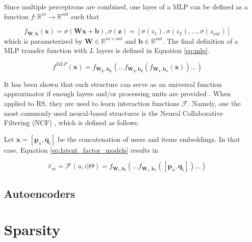     Since multiple perceptrons are combined, one layer of a MLP can be defined as a function  $f: \mathbb{R}^{in} \rightarrow \mathbb{R}^{out}$ such that 
    
    \begin{equation*}
        f_{\mathbf{W}, \mathbf{b}}(\mathbf{x}) = \sigma(\mathbf{W}\mathbf{x} + \mathbf{b}), \sigma(\mathbf{z}) = [\sigma(z_1), \sigma(z_2), \ldots, \sigma(z_{out})]
        \label{eq:layer}
    \end{equation*} which is parameterized by $\textbf{W} \in \mathbb{R}^{in \times out}$ and $\mathbf{b} \in \mathbb{R}^{out}$. The final definition of a MLP transfer function with $L$ layers is defined in Equation \ref{eq:mlp}.
    
    \begin{equation}
        f^{MLP}(\mathbf{x}) = f_{\mathbf{W_L}, \mathbf{b_L}}(\ldots f_{\mathbf{W_2}, \mathbf{b_2}}(f_{\mathbf{W_1}, \mathbf{b_1}} (\mathbf{x}))\ldots)
        \label{eq:mlp}
    \end{equation}
    
    It has been shown that such structure can serve as an universal function approximator if enough layers and/or processing units are provided \cite{10.5555/521706}. When applied to RS, they are used to learn interaction functions $\mathcal{F}$. Namely, one the most commonly used neural-based structures is the Neural Collaborative Filtering (NCF)  \cite{10.1145/3038912.3052569}, which is defined as follows.
    
    Let $\mathbf{x} = [\mathbf{p}_u, \mathbf{q}_i]$ be the concatenation of users and items embeddings. In that case, Equation \ref{eq:latent_factor_models} results in
    
    \begin{equation*}
        \hat{r}_{ui} = \mathcal{F}(u,i|\Theta) = f_{\mathbf{W}_l, \mathbf{b}_l}(\ldots f_{\mathbf{W}_1, \mathbf{b}_1}([\mathbf{p}_u, \mathbf{q}_i]) \ldots)
    \end{equation*}

    \subsection{Autoencoders}




\section{Sparsity}

